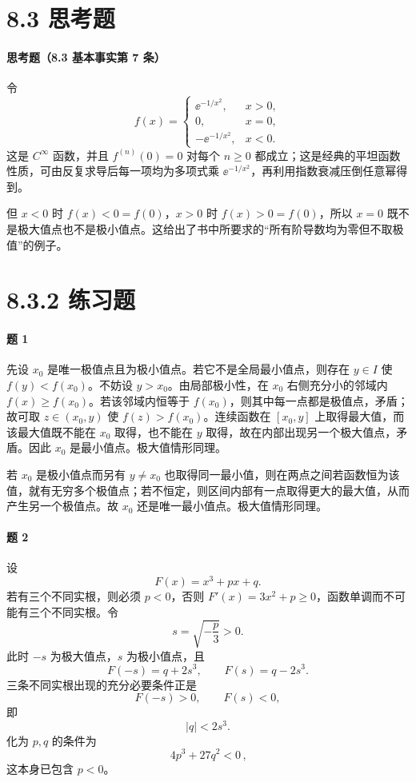 \section*{8.3 思考题}

\paragraph{思考题（8.3 基本事实第 7 条）}
\begin{xsolution}
令
\[
  f(x)=
  \begin{cases}
    \ee^{-1/x^2},&x>0,\\
    0,&x=0,\\
    -\ee^{-1/x^2},&x<0.
  \end{cases}
\]
这是 $C^\infty$ 函数，并且 $f^{(n)}(0)=0$ 对每个 $n\ge0$ 都成立；这是经典的平坦函数性质，可由反复求导后每一项均为多项式乘 $\ee^{-1/x^2}$，再利用指数衰减压倒任意幂得到。

但 $x<0$ 时 $f(x)<0=f(0)$，$x>0$ 时 $f(x)>0=f(0)$，所以 $x=0$ 既不是极大值点也不是极小值点。这给出了书中所要求的“所有阶导数均为零但不取极值”的例子。
\end{xsolution}

\section*{8.3.2 练习题}

\paragraph{题 1}
\begin{xsolution}
先设 $x_0$ 是唯一极值点且为极小值点。若它不是全局最小值点，则存在 $y\in I$ 使 $f(y)<f(x_0)$。不妨设 $y>x_0$。由局部极小性，在 $x_0$ 右侧充分小的邻域内 $f(x)\ge f(x_0)$。若该邻域内恒等于 $f(x_0)$，则其中每一点都是极值点，矛盾；故可取 $z\in(x_0,y)$ 使 $f(z)>f(x_0)$。连续函数在 $[x_0,y]$ 上取得最大值，而该最大值既不能在 $x_0$ 取得，也不能在 $y$ 取得，故在内部出现另一个极大值点，矛盾。因此 $x_0$ 是最小值点。极大值情形同理。

若 $x_0$ 是极小值点而另有 $y\ne x_0$ 也取得同一最小值，则在两点之间若函数恒为该值，就有无穷多个极值点；若不恒定，则区间内部有一点取得更大的最大值，从而产生另一个极值点。故 $x_0$ 还是唯一最小值点。极大值情形同理。
\end{xsolution}

\paragraph{题 2}
\begin{xsolution}
设
\[
  F(x)=x^3+px+q.
\]
若有三个不同实根，则必须 $p<0$，否则 $F'(x)=3x^2+p\ge0$，函数单调而不可能有三个不同实根。令
\[
  s=\sqrt{-\frac p3}>0.
\]
此时 $-s$ 为极大值点，$s$ 为极小值点，且
\[
  F(-s)=q+2s^3,\qquad F(s)=q-2s^3.
\]
三条不同实根出现的充分必要条件正是
\[
  F(-s)>0,\qquad F(s)<0,
\]
即
\[
  |q|<2s^3.
\]
化为 $p,q$ 的条件为
\[
  \boxed{\,4p^3+27q^2<0\,},
\]
这本身已包含 $p<0$。
\end{xsolution}

